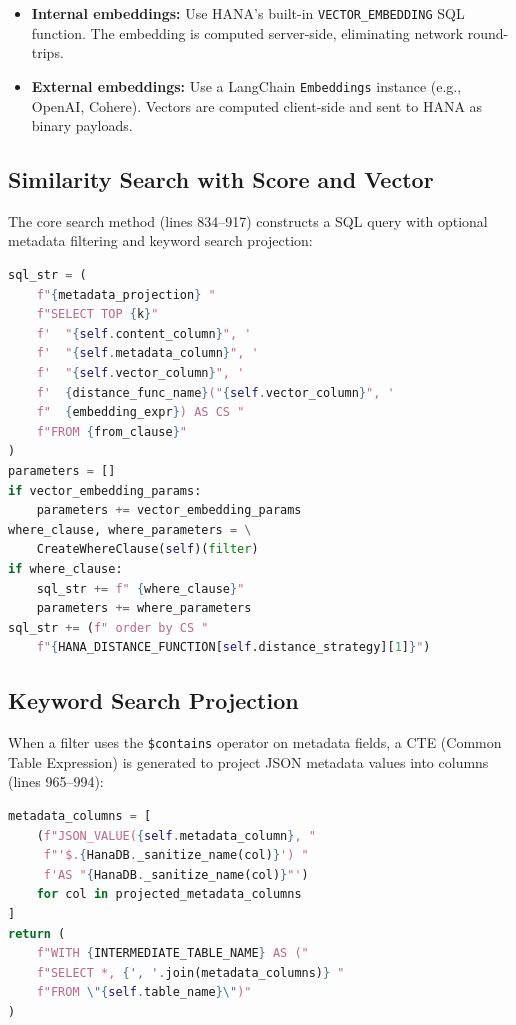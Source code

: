 \documentclass[11pt]{article}
\begin{document}
\begin{itemize}
  \item \textbf{Internal embeddings:} Use HANA's built-in \texttt{VECTOR\_EMBEDDING}
        SQL function. The embedding is computed server-side, eliminating network
        round-trips.
  \item \textbf{External embeddings:} Use a LangChain \texttt{Embeddings} instance
        (e.g., OpenAI, Cohere). Vectors are computed client-side and sent to HANA
        as binary payloads.
\end{itemize}

\subsection{Similarity Search with Score and Vector}

The core search method (lines 834--917) constructs a SQL query with optional
metadata filtering and keyword search projection:

\begin{lstlisting}[language=Python,caption={Core similarity search --- lines 879--896}]
sql_str = (
    f"{metadata_projection} "
    f"SELECT TOP {k}"
    f'  "{self.content_column}", '
    f'  "{self.metadata_column}", '
    f'  "{self.vector_column}", '
    f'  {distance_func_name}("{self.vector_column}", '
    f"  {embedding_expr}) AS CS "
    f"FROM {from_clause}"
)
parameters = []
if vector_embedding_params:
    parameters += vector_embedding_params
where_clause, where_parameters = \
    CreateWhereClause(self)(filter)
if where_clause:
    sql_str += f" {where_clause}"
    parameters += where_parameters
sql_str += (f" order by CS "
    f"{HANA_DISTANCE_FUNCTION[self.distance_strategy][1]}")
\end{lstlisting}

\subsection{Keyword Search Projection}

When a filter uses the \texttt{\$contains} operator on metadata fields, a CTE
(Common Table Expression) is generated to project JSON metadata values into
columns (lines 965--994):

\begin{lstlisting}[language=Python,caption={Metadata projection --- lines 983--994}]
metadata_columns = [
    (f"JSON_VALUE({self.metadata_column}, "
     f"'$.{HanaDB._sanitize_name(col)}') "
     f'AS "{HanaDB._sanitize_name(col)}"')
    for col in projected_metadata_columns
]
return (
    f"WITH {INTERMEDIATE_TABLE_NAME} AS ("
    f"SELECT *, {', '.join(metadata_columns)} "
    f"FROM \"{self.table_name}\")"
)
\end{lstlisting}
\end{document}
